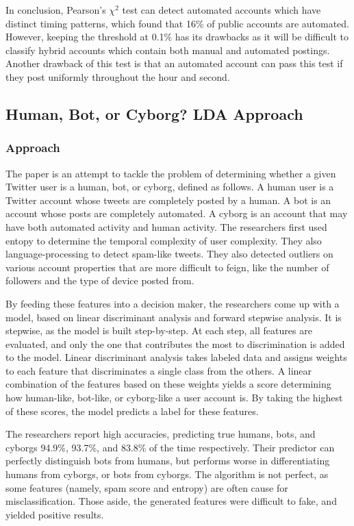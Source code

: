 \documentclass[11pt, oneside]{article}   	%
\begin{document}
\quad In conclusion, Pearson's $\chi^2$ test can detect automated accounts which have distinct timing patterns, which found that 16\% of public accounts are automated. However, keeping the threshold at 0.1\% has its drawbacks as it will be difficult to classify hybrid accounts which contain both manual and automated postings.
Another drawback of this test is that an automated account can pass this test if they post uniformly throughout the hour and second.

\subsection*{Human, Bot, or Cyborg? LDA Approach}

\subsubsection*{Approach}

\quad The paper \cite{cyborg} is an attempt to tackle the problem of determining whether a
given Twitter user is a human, bot, or cyborg, defined as follows.  A human user
is a Twitter account whose tweets are completely posted by a human.  A bot is an
account whose posts are completely automated.  A cyborg is an account that may
have both automated activity and human activity.  The researchers first used
entopy to determine the temporal complexity of user complexity. They also
language-processing to detect spam-like tweets. They also detected outliers on
various account properties that are more difficult to feign, like the
number of followers and the type of device posted from. 

\quad By feeding these features into a decision maker, the researchers come up
with a model, based on linear discriminant analysis and forward stepwise
analysis.  It is stepwise, as the model is built step-by-step.  At each step,
all features are evaluated, and only the one that contributes the most to
discrimination is added to the model.  Linear discriminant analysis takes
labeled data and assigns weights to each feature that discriminates a single
class from the others.  A linear combination of the features based on these
weights yields a score determining how human-like, bot-like, or cyborg-like a
user account is.  By taking the highest of these scores, the model predicts a
label for these features.

\quad The researchers report high accuracies, predicting true humans, bots, and
cyborgs 94.9\%, 93.7\%, and 83.8\% of the time respectively.  Their predictor
can perfectly distinguish bots from humans, but performs worse in
differentiating humans from cyborgs, or bots from cyborgs. The algorithm is not
perfect, as some features (namely, spam score and entropy) are often cause for
misclassification. Those aside, the generated features were difficult to fake,
and yielded positive results.
\end{document}
